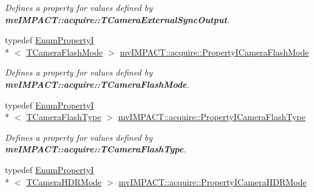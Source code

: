 \begin{DoxyCompactItemize}
\begin{DoxyCompactList}\small\item\em Defines a property for values defined by {\bfseries mv\+I\+M\+P\+A\+C\+T\+::acquire\+::\+T\+Camera\+External\+Sync\+Output}. \end{DoxyCompactList}\item 
\hypertarget{group___device_specific_interface_ga6a8c7e0a6ec0abe20119f36cdde81a1c}{typedef \hyperlink{classmv_i_m_p_a_c_t_1_1acquire_1_1_enum_property_i}{Enum\+Property\+I}\\*
$<$ \hyperlink{group___device_specific_interface_ga7013a9eafe8e5d0e6c9977dacf8871f7}{T\+Camera\+Flash\+Mode} $>$ \hyperlink{group___device_specific_interface_ga6a8c7e0a6ec0abe20119f36cdde81a1c}{mv\+I\+M\+P\+A\+C\+T\+::acquire\+::\+Property\+I\+Camera\+Flash\+Mode}}\label{group___device_specific_interface_ga6a8c7e0a6ec0abe20119f36cdde81a1c}

\begin{DoxyCompactList}\small\item\em Defines a property for values defined by {\bfseries mv\+I\+M\+P\+A\+C\+T\+::acquire\+::\+T\+Camera\+Flash\+Mode}. \end{DoxyCompactList}\item 
\hypertarget{group___device_specific_interface_ga597262f972ec6a59487c7434c39ecfba}{typedef \hyperlink{classmv_i_m_p_a_c_t_1_1acquire_1_1_enum_property_i}{Enum\+Property\+I}\\*
$<$ \hyperlink{group___device_specific_interface_gafecb78a5d28cf072b169a8214d6b9a34}{T\+Camera\+Flash\+Type} $>$ \hyperlink{group___device_specific_interface_ga597262f972ec6a59487c7434c39ecfba}{mv\+I\+M\+P\+A\+C\+T\+::acquire\+::\+Property\+I\+Camera\+Flash\+Type}}\label{group___device_specific_interface_ga597262f972ec6a59487c7434c39ecfba}

\begin{DoxyCompactList}\small\item\em Defines a property for values defined by {\bfseries mv\+I\+M\+P\+A\+C\+T\+::acquire\+::\+T\+Camera\+Flash\+Type}. \end{DoxyCompactList}\item 
\hypertarget{group___device_specific_interface_ga9fcfc71faac692386a041097fd751d24}{typedef \hyperlink{classmv_i_m_p_a_c_t_1_1acquire_1_1_enum_property_i}{Enum\+Property\+I}\\*
$<$ \hyperlink{group___device_specific_interface_ga4d3429fb463a4c07dc7a32d43c04f5d4}{T\+Camera\+H\+D\+R\+Mode} $>$ \hyperlink{group___device_specific_interface_ga9fcfc71faac692386a041097fd751d24}{mv\+I\+M\+P\+A\+C\+T\+::acquire\+::\+Property\+I\+Camera\+H\+D\+R\+Mode}}\label{group___device_specific_interface_ga9fcfc71faac692386a041097fd751d24}


\end{DoxyCompactItemize}
